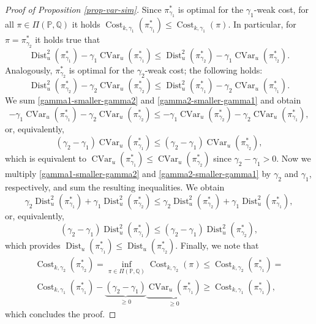 \documentclass{article} %
\DeclareMathOperator{\CVar}{CVar}
\DeclareMathOperator{\Dist}{Dist}
\DeclareMathOperator{\Cost}{Cost}
\begin{document}
\begin{proof}[Proof of Proposition \ref{prop-var-sim}]
Since $\pi_{\gamma_{1}}^{*}$ is optimal for the $\gamma_{1}$-weak cost, for all $\pi\in\Pi(\mathbb{P},\mathbb{Q})$ it holds $\Cost_{k,\gamma_{1}}(\pi_{\gamma_1}^{*})\leq \Cost_{k,\gamma_{1}}(\pi)$. In particular, for $\pi=\pi_{\gamma_2}^{*}$ it holds true that
\begin{equation}
    \Dist_{u}^{2}(\pi_{\gamma_1}^{*})-\gamma_{1} \CVar_{u}(\pi_{\gamma_1}^{*})\leq \Dist_{u}^{2}(\pi_{\gamma_2}^{*})-\gamma_{1} \CVar_{u}(\pi_{\gamma_2}^{*}).
    \label{gamma1-smaller-gamma2}
\end{equation}
Analogously, $\pi_{\gamma_{2}}^{*}$ is optimal for the $\gamma_{2}$-weak cost; the following holds:
\begin{equation}
    \Dist_{u}^{2}(\pi_{\gamma_2}^{*})\!-\!\gamma_{2} \CVar_{u}(\pi_{\gamma_2}^{*})\!\leq\! \Dist_{u}^{2}(\pi_{\gamma_1}^{*})\!-\!\gamma_{2} \CVar_{u}(\pi_{\gamma_1}^{*}).
    \label{gamma2-smaller-gamma1}
\end{equation}
We sum \eqref{gamma1-smaller-gamma2} and \eqref{gamma2-smaller-gamma1} and obtain
$$-\gamma_{1} \CVar_{u}(\pi_{\gamma_1}^{*})-\gamma_{2} \CVar_{u}(\pi_{\gamma_2}^{*})\leq -\gamma_{1} \CVar_{u}(\pi_{\gamma_2}^{*})-\gamma_{2} \CVar_{u}(\pi_{\gamma_1}^{*}),$$
or, equivalently,
$$(\gamma_{2}-\gamma_{1})\CVar_{u}(\pi_{\gamma_1}^{*})\leq (\gamma_{2}-\gamma_{1})\CVar_{u}(\pi_{\gamma_2}^{*}),$$
which is equivalent to $\CVar_{u}(\pi_{\gamma_1}^{*})\leq \CVar_{u}(\pi_{\gamma_2}^{*})$ since $\gamma_{2}-\gamma_{1}>0$. Now we multiply \eqref{gamma1-smaller-gamma2} and \eqref{gamma2-smaller-gamma1} by $\gamma_{2}$ and $\gamma_{1}$, respectively, and sum the resulting inequalities. We obtain
$$\gamma_{2}\Dist_{u}^{2}(\pi_{\gamma_1}^{*})+\gamma_{1}\Dist_{u}^{2}(\pi_{\gamma_2}^{*})\leq\gamma_{2}\Dist_{u}^{2}(\pi_{\gamma_2}^{*})+\gamma_{1}\Dist_{u}^{2}(\pi_{\gamma_1}^{*}),$$
or, equivalently,
$$(\gamma_{2}-\gamma_{1})\Dist_{u}^{2}(\pi_{\gamma_1}^{*})\leq(\gamma_{2}-\gamma_{1})\Dist_{u}^{2}(\pi_{\gamma_2}^{*}),$$
which provides $\Dist_{u}(\pi_{\gamma_1}^{*})\leq\Dist_{u}(\pi_{\gamma_2}^{*})$. Finally, we note that 
\begin{eqnarray}\Cost_{k,\gamma_{2}}(\pi_{\gamma_{2}}^{*})=\inf_{\pi\in\Pi(\mathbb{P},\mathbb{Q})}\Cost_{k,\gamma_{2}}(\pi)\leq \Cost_{k,\gamma_{2}}(\pi_{\gamma_{1}}^{*})=
\nonumber
\\
\Cost_{k,\gamma_{1}}(\pi_{\gamma_{1}}^{*})-\underbrace{(\gamma_{2}-\gamma_{1})}_{\geq 0}\underbrace{\CVar_{u}(\pi_{\gamma_{1}}^{*})}_{\geq 0}\geq  \Cost_{k,\gamma_{1}}(\pi_{\gamma_{1}}^{*}),
\end{eqnarray}
which concludes the proof.
\end{proof}
\end{document}
